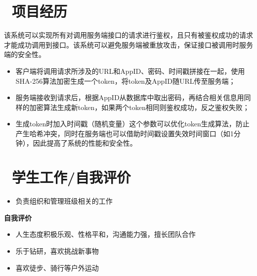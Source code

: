 \documentclass{resume}
\begin{document}
\section{\ 项目经历}
\qquad 该系统可以实现所有对调用服务端接口的请求进行鉴权，且只有被鉴权成功的请求才能成功调用到接口。该系统可以避免服务端被重放攻击，保证接口被调用时服务端的安全性。
\begin{itemize}
  \item 客户端将调用请求所涉及的URL和AppID、密码、时间戳拼接在一起，使用SHA-256算法加密生成一个token，将token及AppID随URL传至服务端；
  \item 服务端接收到请求后，根据AppID从数据库中取出密码，再结合相关信息用同样的加密算法生成新token，如果两个token相同则鉴权成功，反之鉴权失败；
  \item 生成token时加入时间戳（随机变量）这个参数可以优化token生成算法，防止产生哈希冲突，同时在服务端也可以借助时间戳设置失效时间窗口（如1分钟），因此提高了系统的性能和安全性。
\end{itemize}

\section{\ 学生工作/自我评价}
\begin{itemize}
    \item 负责组织和管理班级相关的工作
\end{itemize}
\textbf{自我评价}
\begin{itemize}
    \item 人生态度积极乐观、性格平和，沟通能力强，擅长团队合作
    \item 乐于钻研，喜欢挑战新事物
    \item 喜欢徒步、骑行等户外运动
\end{itemize}




%
%
\end{document}
